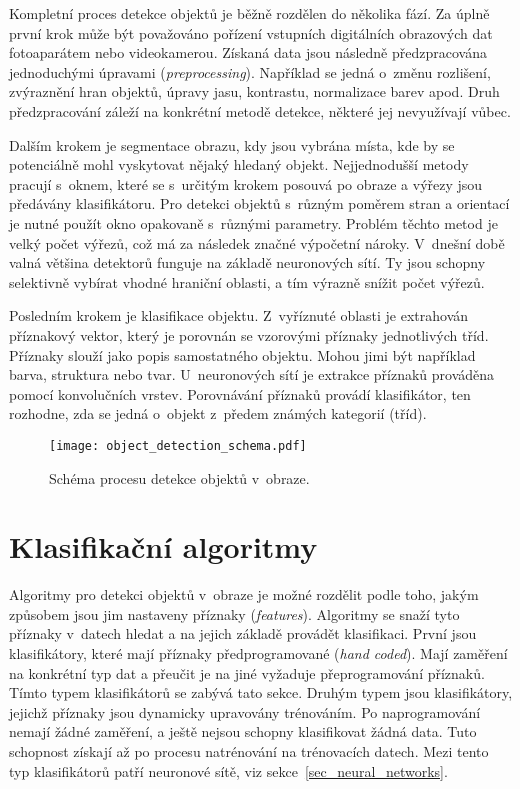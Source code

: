 Kompletní proces detekce objektů je běžně rozdělen do několika fází. Za úplně první krok může být považováno pořízení vstupních digitálních obrazových dat fotoaparátem nebo videokamerou. Získaná data jsou následně předzpracována jednoduchými úpravami (\textit{preprocessing}). Například se jedná o~změnu rozlišení, zvýraznění hran objektů, úpravy jasu, kontrastu, normalizace barev apod. Druh předzpracování záleží na konkrétní metodě detekce, některé jej nevyužívají vůbec.

Dalším krokem je segmentace obrazu, kdy jsou vybrána místa, kde by se potenciálně mohl vyskytovat nějaký hledaný objekt. Nejjednodušší metody pracují s~oknem, které se s~určitým krokem posouvá po obraze a výřezy jsou předávány klasifikátoru. Pro detekci objektů s~různým poměrem stran a orientací je nutné použít okno opakovaně s~různými parametry. Problém těchto metod je velký počet výřezů, což má za následek značné výpočetní nároky. V~dnešní době valná většina detektorů funguje na základě neuronových sítí. Ty jsou schopny selektivně vybírat vhodné hraniční oblasti, a tím výrazně snížit počet výřezů.

Posledním krokem je klasifikace objektu. Z~vyříznuté oblasti je extrahován příznakový vektor, který je porovnán se vzorovými příznaky jednotlivých tříd. Příznaky slouží jako popis samostatného objektu. Mohou jimi být například barva, struktura nebo tvar. U~neuronových sítí je extrakce příznaků prováděna pomocí konvolučních vrstev. Porovnávání příznaků provádí klasifikátor, ten rozhodne, zda se jedná o~objekt z~předem známých kategorií (tříd).

\begin{figure}[H]
    \centering
    \texttt{[image: object\_detection\_schema.pdf]}
    \caption[Schéma procesu detekce objektů v~obraze]{Schéma procesu detekce objektů v~obraze.}
    \label{fig_object_detection_schema}
\end{figure}


\section{Klasifikační algoritmy}
\label{sec_classification_algorithms}

Algoritmy pro detekci objektů v~obraze je možné rozdělit podle toho, jakým způsobem jsou jim nastaveny příznaky (\textit{features}). Algoritmy se snaží tyto příznaky v~datech hledat a na jejich základě provádět klasifikaci. První jsou klasifikátory, které mají příznaky předprogramované (\textit{hand coded}). Mají zaměření na konkrétní typ dat a přeučit je na jiné vyžaduje přeprogramování příznaků. Tímto typem klasifikátorů se zabývá tato sekce. Druhým typem jsou klasifikátory, jejichž příznaky jsou dynamicky upravovány trénováním. Po naprogramování nemají žádné zaměření, a ještě nejsou schopny klasifikovat žádná data. Tuto schopnost získají až po procesu natrénování na trénovacích datech. Mezi tento typ klasifikátorů patří neuronové sítě, viz sekce~\ref{sec_neural_networks}.

